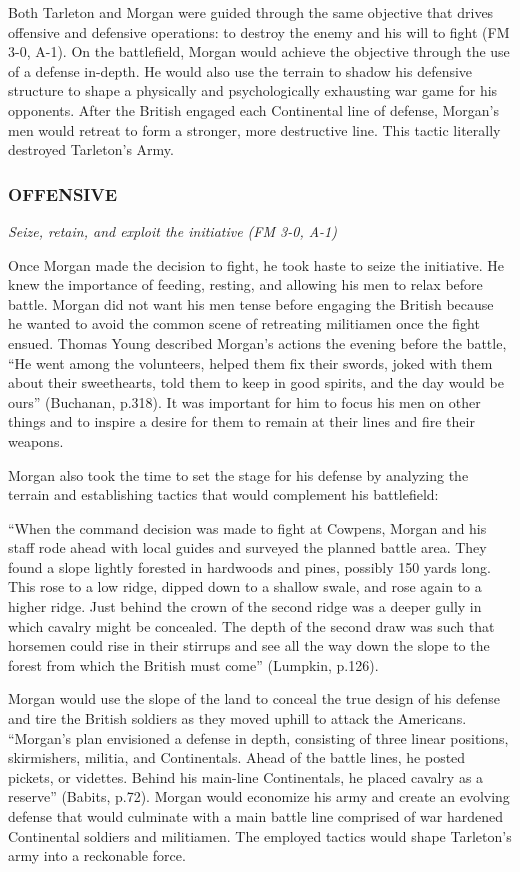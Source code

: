 Both Tarleton and Morgan were guided through the same objective that drives
offensive and defensive operations: to destroy the enemy and his will to fight
(FM 3-0, A-1).  On the battlefield, Morgan would achieve the objective through
the use of a defense in-depth.  He would also use the terrain to shadow his
defensive structure to shape a physically and psychologically exhausting war
game for his opponents.  After the British engaged each Continental line of
defense, Morgan’s men would retreat to form a stronger, more destructive line.
This tactic literally destroyed Tarleton’s Army.  

\subsubsection{OFFENSIVE}

\textit{Seize, retain, and exploit the initiative (FM 3-0, A-1)}

Once Morgan made the decision to fight, he took haste to seize the initiative.
He knew the importance of feeding, resting, and allowing his men to relax
before battle.  Morgan did not want his men tense before engaging the British
because he wanted to avoid the common scene of retreating militiamen once the
fight ensued.  Thomas Young described Morgan’s actions the evening before the
battle, “He went among the volunteers, helped them fix their swords, joked with
them about their sweethearts, told them to keep in good spirits, and the day
would be ours” (Buchanan, p.318).   It was important for him to focus his men
on other things and to inspire a desire for them to remain at their lines and
fire their weapons.  

Morgan also took the time to set the stage for his defense by analyzing the
terrain and establishing tactics that would complement his battlefield:

“When the command decision was made to fight at Cowpens, Morgan and his staff
rode ahead with local guides and surveyed the planned battle area.  They found
a slope lightly forested in hardwoods and pines, possibly 150 yards long.  This
rose to a low ridge, dipped down to a shallow swale, and rose again to a higher
ridge.  Just behind the crown of the second ridge was a deeper gully in which
cavalry might be concealed.  The depth of the second draw was such that
horsemen could rise in their stirrups and see all the way down the slope to the
forest from which the British must come” (Lumpkin, p.126). 

Morgan would use the slope of the land to conceal the true design of his
defense and tire the British soldiers as they moved uphill to attack the
Americans.  “Morgan’s plan envisioned a defense in depth, consisting of three
linear positions, skirmishers, militia, and Continentals.  Ahead of the battle
lines, he posted pickets, or videttes.  Behind his main-line Continentals, he
placed cavalry as a reserve” (Babits, p.72).  Morgan would economize his army
and create an evolving defense that would culminate with a main battle line
comprised of war hardened Continental soldiers and militiamen.    The employed
tactics would shape Tarleton’s army into a reckonable force.

